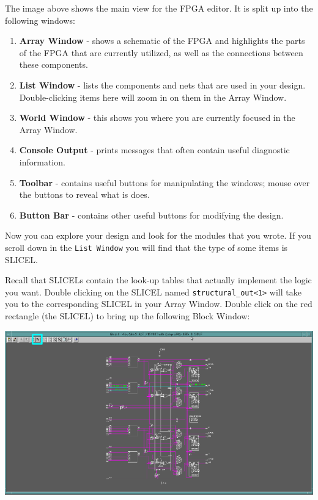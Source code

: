 \documentclass[11pt]{article}
\begin{document}
The image above shows the main view for the FPGA editor. It is split up into the following windows:

\begin{enumerate}
	\item \textbf{Array Window} - shows a schematic of the FPGA and highlights the parts of the FPGA that are currently utilized, as well as the connections between these components.
	\item \textbf{List Window} - lists the components and nets that are used in your design. Double-clicking items here will zoom in on them in the Array Window.
	\item \textbf{World Window} - this shows you where you are currently focused in the Array Window.
	\item \textbf{Console Output} - prints messages that often contain useful diagnostic information.
	\item \textbf{Toolbar} - contains useful buttons for manipulating the windows; mouse over the buttons to reveal what is does.
	\item \textbf{Button Bar} - contains other useful buttons for modifying the design.
\end{enumerate}

Now you can explore your design and look for the modules that you wrote. If you scroll down in the \verb|List Window| you will find that the type of some items is SLICEL.

Recall that SLICELs contain the look-up tables that actually implement the logic you want. Double clicking on the SLICEL named \verb|structural_out<1>| will take you to the corresponding SLICEL in your Array Window. Double click on the red rectangle (the SLICEL) to bring up the following Block Window:

\begin{center}
	\includegraphics[width=\textwidth]{images/fpga_editor_2.png}
\end{center}
\end{document}
